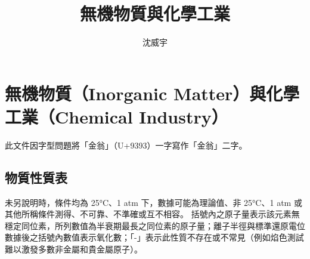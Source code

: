 \documentclass[a4paper,12pt]{report}
\begin{document}
\title{無機物質與化學工業}
\author{沈威宇}
\date{\temtoday}
\titletocdoc
\chapter{無機物質（Inorganic Matter）與化學工業（Chemical Industry）}
此文件因字型問題將「金翁」（U+9393）一字寫作「金翁」二字。
\section{物質性質表}
未另說明時，條件均為 25°C、1 atm 下，數據可能為理論值、非 25°C、1 atm 或其他所稱條件測得、不可靠、不準確或互不相容。
括號內之原子量表示該元素無穩定同位素，所列數值為半衰期最長之同位素的原子量；離子半徑與標準還原電位數據後之括號內數值表示氧化數；「-」表示此性質不存在或不常見（例如焰色測試難以激發多數非金屬和貴金屬原子）。
\end{document}
